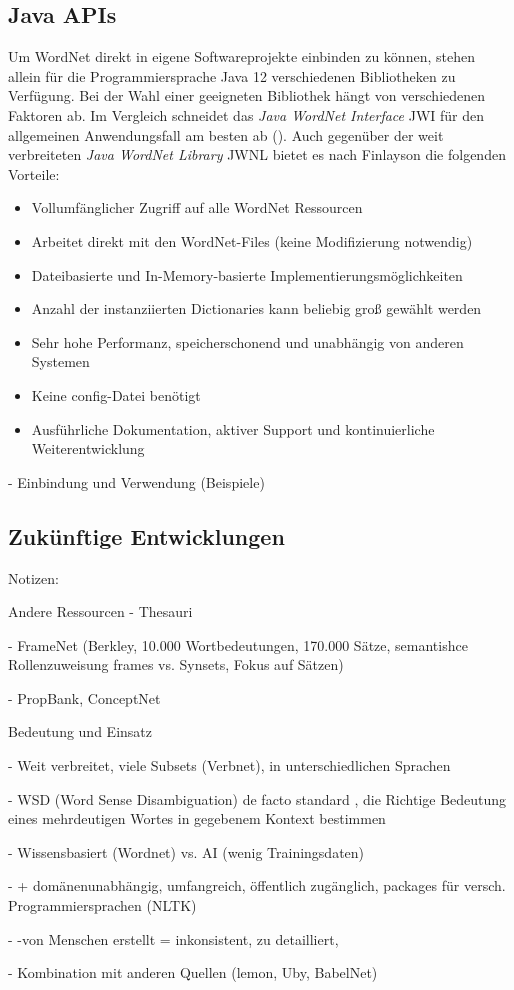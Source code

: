 \subsection{Java APIs}

Um WordNet direkt in eigene Softwareprojekte einbinden zu können, stehen allein für die Programmiersprache Java 12 verschiedenen Bibliotheken zu Verfügung. Bei der Wahl einer geeigneten Bibliothek hängt von verschiedenen Faktoren ab. Im Vergleich schneidet das \textit{Java WordNet Interface} \ac{JWI} für den allgemeinen Anwendungsfall am besten ab (\cite[vgl.][2]{FINLAYSON}). Auch gegenüber der weit verbreiteten \textit{Java WordNet Library} \ac{JWNL} bietet es nach Finlayson die folgenden Vorteile:

\begin{itemize} 
\item Vollumfänglicher Zugriff auf alle WordNet Ressourcen
\item Arbeitet direkt mit den WordNet-Files (keine Modifizierung notwendig)
\item Dateibasierte und In-Memory-basierte Implementierungsmöglichkeiten
\item Anzahl der instanziierten Dictionaries kann beliebig groß gewählt werden
\item Sehr hohe Performanz, speicherschonend und unabhängig von anderen Systemen
\item Keine config-Datei benötigt 
\item Ausführliche Dokumentation, aktiver Support und kontinuierliche Weiterentwicklung
\end{itemize}

- Einbindung und Verwendung (Beispiele)

\subsection{Zukünftige Entwicklungen}

Notizen:

Andere Ressourcen
-	Thesauri

-	FrameNet (Berkley, 10.000 Wortbedeutungen, 170.000
Sätze, semantishce Rollenzuweisung frames vs. Synsets, Fokus auf Sätzen)

-	PropBank, ConceptNet




Bedeutung und Einsatz

-	Weit verbreitet, viele Subsets (Verbnet), in unterschiedlichen Sprachen

-	WSD (Word Sense Disambiguation) de facto standard , die Richtige Bedeutung eines mehrdeutigen Wortes in gegebenem Kontext bestimmen

-	Wissensbasiert (Wordnet) vs. AI (wenig Trainingsdaten)

-	+ domänenunabhängig, umfangreich, öffentlich zugänglich, packages für versch. Programmiersprachen (NLTK)

-	-von Menschen erstellt = inkonsistent, zu detailliert,
 
-	Kombination mit anderen Quellen (lemon, Uby, BabelNet)